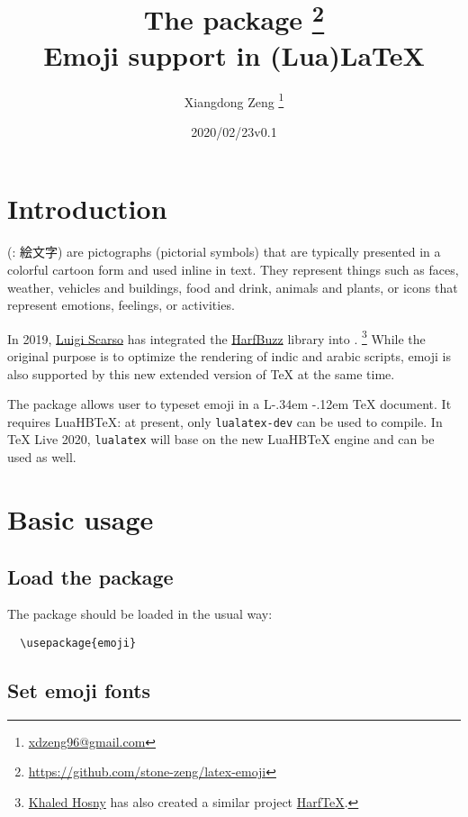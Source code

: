 \documentclass{l3doc}
\title{The \pkg{emoji} package \thanks{\url{https://github.com/stone-zeng/latex-emoji}} \\
  Emoji support in (Lua)\LaTeX}
\author{Xiangdong Zeng \thanks{\url{xdzeng96@gmail.com}}}
\date{\emoji{date} 2020/02/23\quad v0.1}
\DeclareRobustCommand{\LaTeX}{
  L\kern-.34em
  \raisebox{.36ex}{\scalebox{0.9}{\textsc{a}}}
  \kern-.12em
  \TeX}
\newcounter { emoji }
\def\LuaHBTeX{LuaHB\TeX}
\begin{document}
\maketitle

\tableofcontents

\section{ Introduction}

 (: {\fontja 絵文字}) are pictographs (pictorial symbols) that are
typically presented in a colorful cartoon form and used inline in text. They represent things
such as faces, weather, vehicles and buildings, food and drink, animals and plants, or icons
that represent emotions, feelings, or activities.\textsuperscript{\cite{utr51}}

In 2019, \href{https://github.com/luigiScarso}{Luigi Scarso} has integrated the
\href{https://github.com/harfbuzz/harfbuzz}{HarfBuzz} library into \LuaTeX.%
\footnote{\href{https://github.com/khaledhosny}{Khaled Hosny} has also created a similar project
\href{https://github.com/khaledhosny/harftex}{HarfTeX}.}
While the original purpose is to optimize the rendering of indic and arabic scripts, emoji is
also supported by this new extended version of \TeX{} at the same time.

The  package allows user to typeset emoji in a \LaTeX{} document. It requires
\LuaHBTeX{}: at present, only \texttt{lualatex-dev} can be used to compile. In \TeX{} Live 2020,
\texttt{lualatex} will base on the new \LuaHBTeX{} engine and can be used as well.

\section{ Basic usage}

\subsection{ Load the package}

The package should be loaded in the usual way:

\begin{verbatim}
  \usepackage{emoji}
\end{verbatim}

\subsection{ Set emoji fonts}
\end{document}
